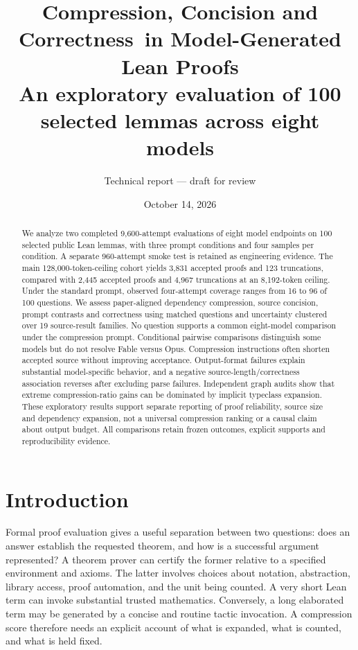 \documentclass[11pt]{article}
\title{\textbf{Compression, Concision and Correctness\ in Model-Generated Lean Proofs}\\[0.5em]\large An exploratory evaluation of 100 selected lemmas across eight models}
\author{Technical report --- draft for review}
\date{October 14, 2026}
\begin{document}
\maketitle
\begin{abstract}
We analyze two completed 9,600-attempt evaluations of eight model endpoints on 100 selected public Lean lemmas, with three prompt conditions and four samples per condition. A separate 960-attempt smoke test is retained as engineering evidence. The main 128,000-token-ceiling cohort yields 3,831 accepted proofs and 123 truncations, compared with 2,445 accepted proofs and 4,967 truncations at an 8,192-token ceiling. Under the standard prompt, observed four-attempt coverage ranges from 16 to 96 of 100 questions. We assess paper-aligned dependency compression, source concision, prompt contrasts and correctness using matched questions and uncertainty clustered over 19 source-result families. No question supports a common eight-model comparison under the compression prompt. Conditional pairwise comparisons distinguish some models but do not resolve Fable versus Opus. Compression instructions often shorten accepted source without improving acceptance. Output-format failures explain substantial model-specific behavior, and a negative source-length/correctness association reverses after excluding parse failures. Independent graph audits show that extreme compression-ratio gains can be dominated by implicit typeclass expansion. These exploratory results support separate reporting of proof reliability, source size and dependency expansion, not a universal compression ranking or a causal claim about output budget. All comparisons retain frozen outcomes, explicit supports and reproducibility evidence.
\end{abstract}
\tableofcontents
\clearpage

\section{Introduction}
Formal proof evaluation gives a useful separation between two questions: does an answer establish the requested theorem, and how is a successful argument represented? A theorem prover can certify the former relative to a specified environment and axioms. The latter involves choices about notation, abstraction, library access, proof automation, and the unit being counted. A very short Lean term can invoke substantial trusted mathematics. Conversely, a long elaborated term may be generated by a concise and routine tactic invocation. A compression score therefore needs an explicit account of what is expanded, what is counted, and what is held fixed.
\end{document}
